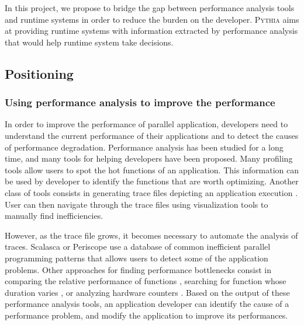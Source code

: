 \documentclass[a4paper,11pt,defblank]{article}
\newcommand{\pname}{\textsc{Pythia}\xspace}
\begin{document}
In this project, we propose to bridge the gap between performance
analysis tools and runtime systems in order to reduce the burden on
the developer. \pname aims at providing runtime systems with
information extracted by performance analysis that would help runtime
system take decisions.

\subsection{Positioning}

\vspace{1cm}
\subsubsection{Using performance analysis to improve the performance}
In order to improve the performance of parallel application,
developers need to understand the current performance of their
applications and to detect the causes of performance
degradation. Performance analysis has been studied for a long time, and
many tools for helping developers have been proposed. Many profiling
tools \cite{gprof, linux_perf, arm_map, profiling_mpi} allow users to
spot the hot functions of an application. This information can be used
by developer to identify the functions that are worth
optimizing. Another class of tools consists in generating trace files
depicting an application execution \cite{vampirtrace, eztrace,
  pablo}. User can then navigate through the trace files using
visualization tools \cite{jumpshot, vampir, vite} to manually find
inefficiencies.

However, as the trace file grows, it becomes necessary to automate the
analysis of traces. Scalasca or Periscope \cite{wolf2003automatic,
  scalasca, benedict2010periscope} use a database of common
inefficient parallel programming patterns that allows users to detect
some of the application problems. Other approaches for finding
performance bottlenecks consist in comparing the relative performance
of functions \cite{coz}, searching for function whose duration varies
\cite{perfume}, or analyzing hardware counters \cite{xu2010cache}.
Based on the output of these performance analysis tools, an
application developer can identify the cause of a performance problem,
and modify the application to improve its performances.
\end{document}
